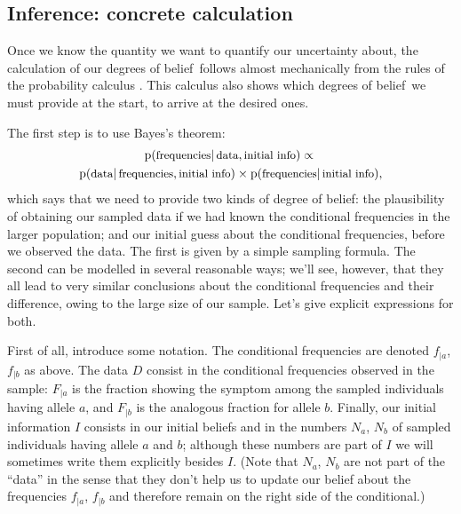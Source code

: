 \documentclass[\ifafour a4paper,12pt,\else a5paper,10pt,\fi%
onecolumn,oneside,article,%
british%
]{memoir}
\theoremstyle{remark}
\theoremstyle{innote}
\newcommand*{\citep}{\parencites}
\newcommand*{\pf}{\mathrm{p}}%
\renewcommand*{\|}{\mathpunct{|}}
\newcommand*{\ptext}[1]{\text{\small #1}}
\newcommand*{\dob}{degree of belief}
\newcommand*{\dobs}{degrees of belief}
\newcommand*{\yD}{D}
\newcommand*{\yI}{I}
\newcommand*{\ya}{a}
\newcommand*{\yb}{b}
\begin{document}
\subsection{Inference: concrete calculation}
\label{sec:inference}

Once we know the quantity we want to quantify our uncertainty about, the
calculation of our \dobs\ follows almost mechanically from the rules of the
probability calculus
\citep{jeffreys1939_r1983,cox1946,jaynes1994_r2003,hailperin1996}. This
calculus also shows which \dobs\ we must provide at the start, to arrive at
the desired ones.

The first step is to use Bayes's theorem:
\begin{multline}
  \label{eq:intuitive_Bayes}
  \pf(\ptext{frequencies} \| \ptext{data}, \ptext{initial info})
  \propto{}\\
  \pf(\ptext{data} \| \ptext{frequencies}, \ptext{initial info})
  \times
  \pf(\ptext{frequencies} \| \ptext{initial info}),
\end{multline}
which says that we need to provide two kinds of \dob: the plausibility of
obtaining our sampled data if we had known the conditional frequencies in
the larger population; and our initial guess about the conditional
frequencies, before we observed the data. The first is given by a simple
sampling formula. The second can be modelled in several reasonable ways;
we'll see, however, that they all lead to very similar conclusions about
the conditional frequencies and their difference, owing to the large size
of our sample. Let's give explicit expressions for both.

First of all, introduce some notation. The conditional frequencies are
denoted $f_{|\ya}$, $f_{|\yb}$ as above. The data $\yD$ consist in the
conditional frequencies observed in the sample: $F_{|\ya}$ is the fraction
showing the symptom among the sampled individuals having allele $\ya$, and
$F_{|\yb}$ is the analogous fraction for allele $\yb$. Finally, our initial
information $\yI$ consists in our initial beliefs and in the numbers
$N_{\ya}$, $N_{\yb}$ of sampled individuals having allele $\ya$ and $\yb$;
although these numbers are part of $\yI$ we will sometimes write them
explicitly besides $\yI$. (Note that $N_{\ya}$, $N_{\yb}$ are not part of
the \enquote{data} in the sense that they don't help us to update our
belief about the frequencies $f_{|\ya}$, $f_{|\yb}$ and therefore remain on
the right side of the conditional.)
\end{document}
